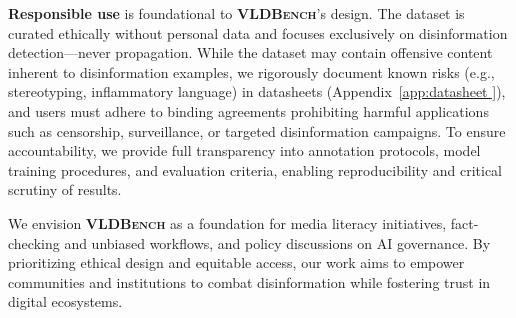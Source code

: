 \textbf{Responsible use} is foundational to \textsf{\textbf{\textsc{VLDBench}}}’s design. The dataset is curated ethically without personal data and focuses exclusively on disinformation detection—never propagation. While the dataset may contain offensive content inherent to disinformation examples, we rigorously document known risks (e.g., stereotyping, inflammatory language) in datasheets (Appendix~\ref{app:datasheet }), and users must adhere to binding agreements prohibiting harmful applications such as censorship, surveillance, or targeted disinformation campaigns. To ensure accountability, we provide full transparency into annotation protocols, model training procedures, and evaluation criteria, enabling reproducibility and critical scrutiny of results.

We envision \textsf{\textbf{\textsc{VLDBench}}} as a foundation for media literacy initiatives, fact-checking and unbiased workflows, and policy discussions on AI governance. By prioritizing ethical design and equitable access, our work aims to empower communities and institutions to combat disinformation while fostering trust in digital ecosystems.